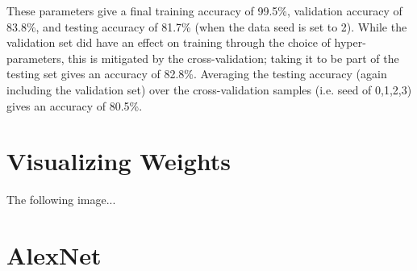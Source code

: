 \documentclass{article}
\begin{document}
   These parameters give a final training accuracy of 99.5\%, validation accuracy of 83.8\%, and
   testing accuracy of 81.7\% (when the data seed is set to 2). While the validation set did have an effect on training through the
   choice of hyper-parameters, this is mitigated by the cross-validation; taking it to be part of
   the testing set gives an accuracy of 82.8\%.
   Averaging the testing accuracy (again including the validation set) over the cross-validation
   samples (i.e. seed of 0,1,2,3) gives an accuracy of 80.5\%.


   \section{Visualizing Weights}
   The following image...

   \section{AlexNet}
\end{document}
